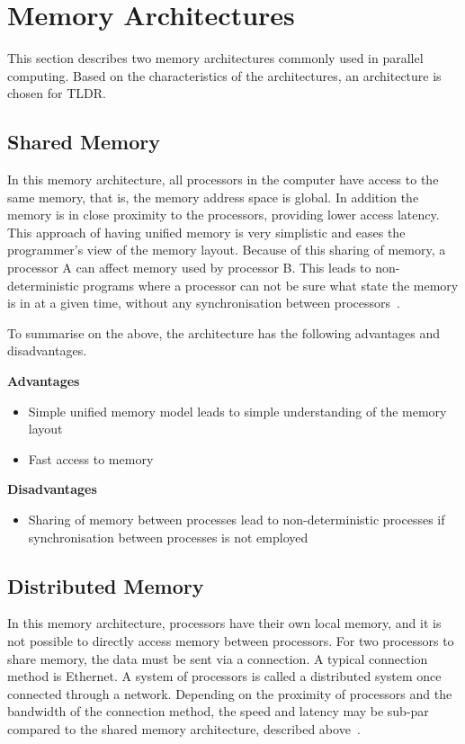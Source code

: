 \section{Memory Architectures}

This section describes two memory architectures commonly used in parallel computing. Based on the characteristics of the architectures, an architecture is chosen for TLDR.

\subsection{Shared Memory}

In this memory architecture, all processors in the computer have access to the same memory, that is, the memory address space is global. In addition the memory is in close proximity to the processors, providing lower access latency. This approach of having unified memory is very simplistic and eases the programmer's view of the memory layout.
Because of this sharing of memory, a processor A can affect memory used by processor B. This leads to non-deterministic programs where a processor can not be sure what state the memory is in at a given time, without any synchronisation between processors~\cite{compLLNL}. 

To summarise on the above, the architecture has the following advantages and disadvantages. 

\noindent\textbf{Advantages}
\begin{itemize}
    \item Simple unified memory model leads to simple understanding of the memory layout
    \item Fast access to memory
\end{itemize}

\noindent\textbf{Disadvantages}
\begin{itemize}
    \item Sharing of memory between processes lead to non-deterministic processes if synchronisation between processes is not employed
\end{itemize}

\subsection{Distributed Memory}

In this memory architecture, processors have their own local memory, and it is not possible to directly access memory between processors.
For two processors to share memory, the data must be sent via a connection. A typical connection method is Ethernet. A system of processors is called a distributed system once connected through a network. Depending on the proximity of processors and the bandwidth of the connection method, the speed and latency may be sub-par compared to the shared memory architecture, described above~\cite{compLLNL}.

